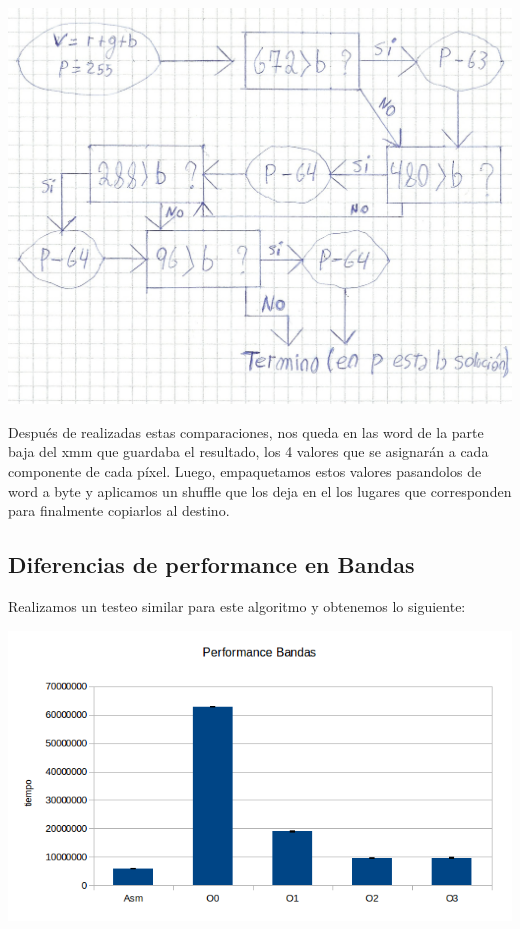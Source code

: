 \documentclass[a4paper]{article}
\begin{document}
\begin{center}
\includegraphics[scale=0.66]{Dibujos/B1.jpg}
\end{center}


 Después de realizadas estas comparaciones, nos queda en las word de la parte baja del xmm que guardaba el resultado, los 4 valores que se asignarán a cada componente de cada píxel. Luego, empaquetamos estos valores pasandolos de word a byte y aplicamos un shuffle que los deja en el los lugares que corresponden para finalmente copiarlos al destino. 

\subsection{Diferencias de performance en Bandas}

Realizamos un testeo similar para este algoritmo y obtenemos lo siguiente:

\newpage

  \begin{center}
  \includegraphics[scale=0.66]{Graficos1.4/ban/per.jpg}
  \end{center}
\end{document}
